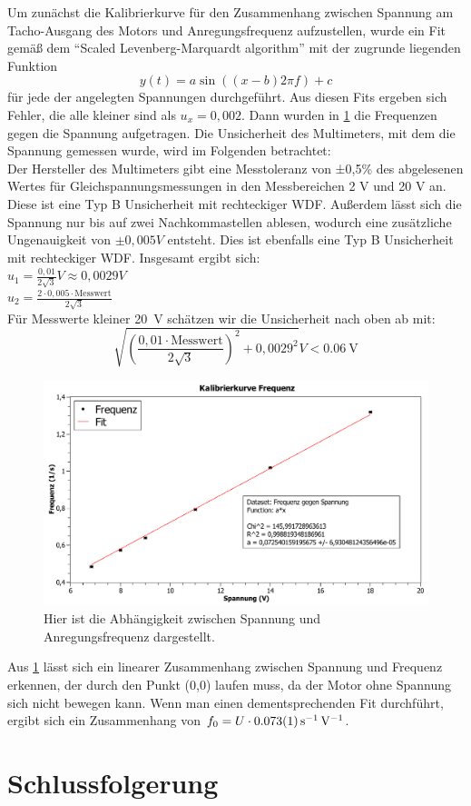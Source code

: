 \documentclass[
	a4paper,
	12pt,
	pagesize,
	ngerman
]{scrartcl}
\begin{document}
	Um zunächst die Kalibrierkurve für den Zusammenhang zwischen Spannung am Tacho-Ausgang des Motors und Anregungsfrequenz aufzustellen, wurde ein Fit gemäß dem \enquote{Scaled Levenberg-Marquardt algorithm} mit der zugrunde liegenden Funktion
	\begin{equation}
	y(t) = a \sin ((x-b)2 \pi f) + c
	\end{equation}
	für jede der angelegten Spannungen durchgeführt. Aus diesen Fits ergeben sich Fehler, die alle kleiner sind als $ u_x = 0,002 $. Dann wurden in \cref{Kalibirierkurve} die Frequenzen gegen die Spannung aufgetragen. Die Unsicherheit des Multimeters, mit dem die Spannung gemessen wurde, wird im Folgenden betrachtet: \\
	Der Hersteller des Multimeters gibt eine Messtoleranz von ±0,5\% des abgelesenen Wertes für Gleichspannungsmessungen in den Messbereichen 2 V und 20 V an. Diese ist eine Typ B Unsicherheit mit rechteckiger WDF. Außerdem lässt sich die Spannung nur bis auf zwei Nachkommastellen ablesen, wodurch eine zusätzliche Ungenauigkeit von $\pm 0,005\si{V}$ entsteht. Dies ist ebenfalls eine Typ B Unsicherheit mit rechteckiger WDF. Insgesamt ergibt sich: \\
	$u_1= \frac{0,01}{2\sqrt{3}} \si{V} \approx 0,0029 \si{V}$ \\
	$u_2= \frac{2 \cdot 0,005 \cdot \text{Messwert}}{2 \sqrt{3}}$ \\ %
	Für Messwerte kleiner \SI{20}{\volt} schätzen wir die Unsicherheit nach oben ab mit:
	\begin{equation*}
		\sqrt{(\frac{0,01 \cdot \text{Messwert}}{2 \sqrt{3}})^2 + 0,0029^2} \si{V} <  \SI{0,06}{\volt}
	\end{equation*}
	
	\begin{figure}[htb]
		\includegraphics[width=1\textwidth]{Kalibrierkurve_Graph}
		\centering
		\caption{Hier ist die Abhängigkeit zwischen Spannung und Anregungsfrequenz dargestellt.}
		\label{Kalibirierkurve}
		\centering
	\end{figure}
	Aus \cref{Kalibirierkurve} lässt sich ein linearer Zusammenhang zwischen Spannung und Frequenz erkennen, der durch den Punkt (0,0) laufen muss, da der Motor ohne Spannung sich nicht bewegen kann. Wenn man einen dementsprechenden Fit durchführt, ergibt sich ein Zusammenhang von $ f_0 = U \cdot \SI{0,073 \pm 0,001}{\per \second \per \volt} $.
	
	
	\section{Schlussfolgerung}
	
\end{document}
